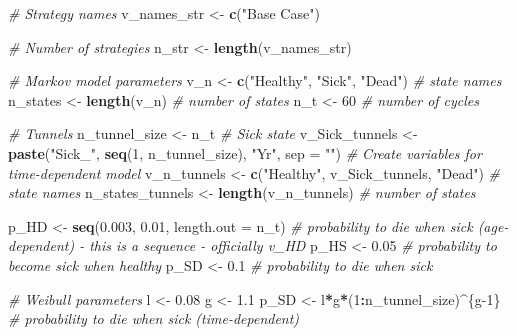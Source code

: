 \documentclass[
]{article}
\newenvironment{Shaded}{\begin{snugshade}}{\end{snugshade}}
\newcommand{\CommentTok}[1]{\textcolor[rgb]{0.56,0.35,0.01}{\textit{#1}}}
\newcommand{\DataTypeTok}[1]{\textcolor[rgb]{0.13,0.29,0.53}{#1}}
\newcommand{\DecValTok}[1]{\textcolor[rgb]{0.00,0.00,0.81}{#1}}
\newcommand{\FloatTok}[1]{\textcolor[rgb]{0.00,0.00,0.81}{#1}}
\newcommand{\KeywordTok}[1]{\textcolor[rgb]{0.13,0.29,0.53}{\textbf{#1}}}
\newcommand{\NormalTok}[1]{#1}
\newcommand{\OperatorTok}[1]{\textcolor[rgb]{0.81,0.36,0.00}{\textbf{#1}}}
\newcommand{\StringTok}[1]{\textcolor[rgb]{0.31,0.60,0.02}{#1}}
\begin{document}
\begin{Shaded}
\begin{Highlighting}[]
\CommentTok{# Strategy names}
\NormalTok{v_names_str <-}\StringTok{ }\KeywordTok{c}\NormalTok{(}\StringTok{"Base Case"}\NormalTok{)  }

\CommentTok{# Number of strategies}
\NormalTok{n_str <-}\StringTok{ }\KeywordTok{length}\NormalTok{(v_names_str)}

\CommentTok{# Markov model parameters}
\NormalTok{v_n  <-}\StringTok{ }\KeywordTok{c}\NormalTok{(}\StringTok{"Healthy"}\NormalTok{, }\StringTok{"Sick"}\NormalTok{, }\StringTok{"Dead"}\NormalTok{)    }\CommentTok{# state names}
\NormalTok{n_states  <-}\StringTok{ }\KeywordTok{length}\NormalTok{(v_n)                }\CommentTok{# number of states}
\NormalTok{n_t  <-}\StringTok{ }\DecValTok{60}                              \CommentTok{# number of cycles}

\CommentTok{# Tunnels}
\NormalTok{n_tunnel_size <-}\StringTok{ }\NormalTok{n_t}
\CommentTok{# Sick state}
\NormalTok{v_Sick_tunnels <-}\StringTok{ }\KeywordTok{paste}\NormalTok{(}\StringTok{"Sick_"}\NormalTok{, }\KeywordTok{seq}\NormalTok{(}\DecValTok{1}\NormalTok{, n_tunnel_size), }\StringTok{"Yr"}\NormalTok{, }\DataTypeTok{sep =} \StringTok{""}\NormalTok{)}
\CommentTok{# Create variables for time-dependent model}
\NormalTok{v_n_tunnels  <-}\StringTok{ }\KeywordTok{c}\NormalTok{(}\StringTok{"Healthy"}\NormalTok{, v_Sick_tunnels, }\StringTok{"Dead"}\NormalTok{)  }\CommentTok{# state names}
\NormalTok{n_states_tunnels  <-}\StringTok{ }\KeywordTok{length}\NormalTok{(v_n_tunnels)              }\CommentTok{# number of states}

\NormalTok{p_HD <-}\StringTok{ }\KeywordTok{seq}\NormalTok{(}\FloatTok{0.003}\NormalTok{, }\FloatTok{0.01}\NormalTok{, }\DataTypeTok{length.out =}\NormalTok{ n_t)  }\CommentTok{# probability to die when sick (age-dependent) - this is a sequence - officially v_HD}
\NormalTok{p_HS <-}\StringTok{ }\FloatTok{0.05}                                \CommentTok{# probability to become sick when healthy}
\NormalTok{p_SD <-}\StringTok{ }\FloatTok{0.1}                                 \CommentTok{# probability to die when sick}

\CommentTok{# Weibull parameters}
\NormalTok{l <-}\StringTok{ }\FloatTok{0.08}
\NormalTok{g <-}\StringTok{ }\FloatTok{1.1}
\NormalTok{p_SD <-}\StringTok{ }\NormalTok{l}\OperatorTok{*}\NormalTok{g}\OperatorTok{*}\NormalTok{(}\DecValTok{1}\OperatorTok{:}\NormalTok{n_tunnel_size)}\OperatorTok{^}\NormalTok{\{g}\DecValTok{-1}\NormalTok{\}         }\CommentTok{# probability to die when sick (time-dependent)}


\end{Highlighting}
\end{Shaded}
\end{document}
